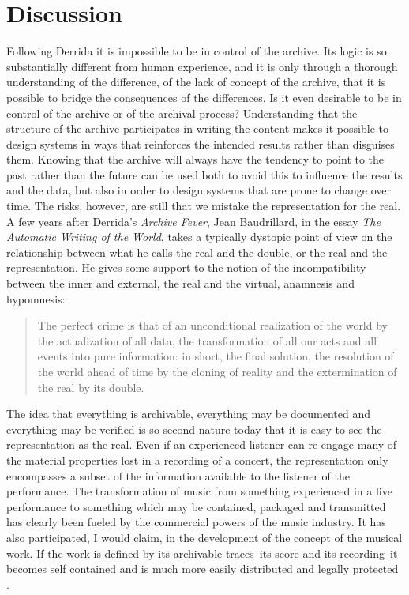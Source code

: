 \documentclass[11pt,a4paper]{article}
\begin{document}
\section*{Discussion}
\label{sec:discussion-1}

Following Derrida it is impossible to be in control of the archive. Its logic is so substantially different from human experience, and it is only through a thorough understanding of the difference, of the lack of concept of the archive, that it is possible to bridge the consequences of the differences. Is it even desirable to be in control of the archive or of the archival process? Understanding that the structure of the archive participates in writing the content makes it possible to design systems in ways that reinforces the intended results rather than disguises them. Knowing that the archive will always have the tendency to point to the past rather than the future can be used both to avoid this to influence the results and the data, but also in order to design systems that are prone to change over time. The risks, however, are still that we mistake the representation for the real. A few years after Derrida's \emph{Archive Fever}, Jean Baudrillard, in the essay \emph{The Automatic Writing of the World}, takes a typically dystopic point of view on the relationship between what he calls the real and the double, or the real and the representation. He gives some support to the notion of the incompatibility between the inner and external, the real and the virtual, anamnesis and hypomnesis:

\begin{quote}
  The perfect crime is that of an unconditional realization of the world by the actualization of all data, the transformation of all our acts and all events into pure information: in short, the final solution, the resolution of the world ahead of time by the cloning of reality and the extermination of the real by its double. \citep[p. 25]{baudrillard96}
\end{quote}

The idea that everything is archivable, everything may be documented and everything may be verified is so second nature today that it is easy to see the representation as the real. Even if an experienced listener can re-engage many of the material properties lost in a recording of a concert, the representation only encompasses a subset of the information available to the listener of the performance. The transformation of music from something experienced in a live performance to something which may be contained, packaged and transmitted has clearly been fueled by the commercial powers of the music industry. It has also participated, I would claim, in the development of the concept of the musical work. If the work is defined by its archivable traces--its score and its recording--it becomes self contained and is much more easily distributed and legally protected \citep{attali85}.
\end{document}
